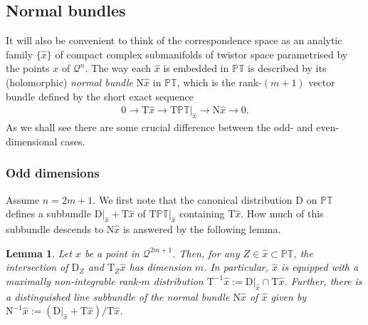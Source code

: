 \documentclass[10pt,a4paper]{amsart}
\numberwithin{equation}{section}
\newtheorem{Lemma}[Theorem]{Lemma}
\newcommand{\mc} [1]{\mathcal{#1}}
\newcommand{\Tgt} {\mathrm{T}}
\newcommand{\Nrm} {\mathrm{N}}
\newcommand{\PT} {\mathbb{PT}}
\begin{document}
\subsection{Normal bundles}\label{sec-normal}
It will also be convenient to think of the correspondence space as an analytic family $\{ \hat{x} \}$ of compact complex submanifolds of twistor space parametrised by the points $x$ of $\mc{Q}^n$. The way each $\hat{x}$ is embedded in $\PT$ is described by its (holomorphic) \emph{normal bundle} $\Nrm \hat{x}$ in
$\PT$, which is the rank-$(m+1)$ vector bundle def\/ined by the short exact sequence
\begin{gather*}
0 \rightarrow \Tgt \hat{x} \rightarrow \Tgt \left. \PT \right|_{\hat{x}} \rightarrow \Nrm \hat{x} \rightarrow 0 .
\end{gather*}
As we shall see there are some crucial dif\/ference between the odd- and even-dimensional cases.

\subsubsection{Odd dimensions}\label{sec-important}
Assume $n=2m+1$. We f\/irst note that the canonical distribution $\mathrm{D}$ on $\PT$ def\/ines a subbundle $\mathrm{D} |_{\hat{x}} + \Tgt \hat{x}$ of $\Tgt \PT |_{\hat{x}}$ containing $\Tgt \hat{x}$. How much of this subbundle descends to $\Nrm \hat{x}$ is answered by the following lemma.
\begin{Lemma}\label{lem-D-Nx}
Let $x$ be a point in $\mc{Q}^{2m+1}$. Then, for any $Z \in \hat{x} \subset \PT$, the intersection of $\mathrm{D}_Z$ and $\Tgt_Z \hat{x}$ has dimension $m$. In particular, $\hat{x}$ is equipped with a maximally non-integrable rank-$m$ distribution $\Tgt^{-1} \hat{x} := \mathrm{D} |_{\hat{x}} \cap \Tgt \hat{x}$. Further, there is a distinguished line subbundle of the normal bundle $\mathrm{N} \hat{x}$ of $\hat{x}$ given by $\Nrm^{-1} \hat{x} := ( \mathrm{D} |_{\hat{x}} + \Tgt \hat{x})/\Tgt \hat{x}$.
\end{Lemma}
\end{document}
